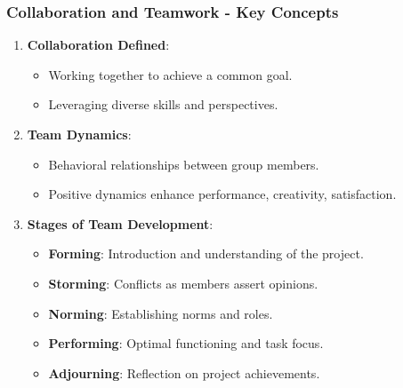 \documentclass[aspectratio=169]{beamer}
\begin{document}
\begin{frame}[fragile]
    \frametitle{Collaboration and Teamwork - Key Concepts}
    \begin{enumerate}
        \item \textbf{Collaboration Defined}:
        \begin{itemize}
            \item Working together to achieve a common goal.
            \item Leveraging diverse skills and perspectives.
        \end{itemize}
        
        \item \textbf{Team Dynamics}:
        \begin{itemize}
            \item Behavioral relationships between group members.
            \item Positive dynamics enhance performance, creativity, satisfaction.
        \end{itemize}
        
        \item \textbf{Stages of Team Development}:
        \begin{itemize}
            \item \textbf{Forming}: Introduction and understanding of the project.
            \item \textbf{Storming}: Conflicts as members assert opinions.
            \item \textbf{Norming}: Establishing norms and roles.
            \item \textbf{Performing}: Optimal functioning and task focus.
            \item \textbf{Adjourning}: Reflection on project achievements.
        \end{itemize}
    \end{enumerate}
\end{frame}
\end{document}
